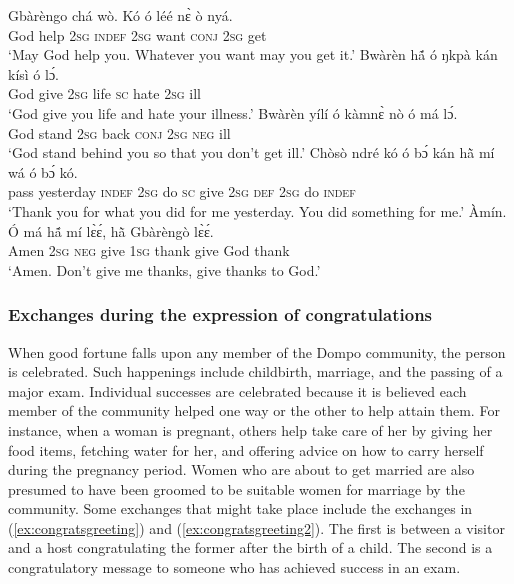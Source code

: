 \documentclass[output=paper,colorlinks,citecolor=brown]{langscibook}
\begin{document}
\ea \label{ex:gratitudegreeting}
\begin{xlist}
\ex
   \gll  Gbàrèngo 	chá	wò.	Kó	ó	léé	nɛ̀ 	ò 	nyá.\\
						God		help	\textsc{2sg}	\textsc{indef}	\textsc{2sg}	want	\textsc{conj}	\textsc{2sg}	get\\
		\glt ‘May God help you. Whatever you want may you get it.’
\ex
   \gll Bwàrèn	hã́	ó	ŋkpà	kán	kísì	ó	lɔ́.\\
    						God		give	\textsc{2sg}	life	\textsc{sc}	hate	\textsc{2sg}	ill	\\
\glt			‘God give you life and hate your illness.’
 \ex
   \gll Bwàrèn	yílí	ó	kàmnɛ̀	nò	ó	má	lɔ́.\\
   						God		stand	\textsc{2sg}	back	\textsc{conj}	\textsc{2sg}	\textsc{neg}	ill		\\
\glt			‘God stand behind you so that you don’t get ill.’
 \ex 
    \gll Chòsò	ndré		kó	ó	bɔ́	kán	hã̀	mí wá	ó	bɔ́	kó.\\
			pass	yesterday	\textsc{indef}	\textsc{2sg}	do	\textsc{sc}	give	\textsc{2sg}		\textsc{def}	\textsc{2sg}	do	\textsc{indef}		\\
	\glt	‘Thank you for what you did for me yesterday. You did something for me.’ 
  \ex
   \gll Àmín.	Ó	má	hã́	mí	lɛ̀ɛ́,	hã̀	Gbàrèngò	lɛ̀ɛ́.\\
   						Amen  \textsc{2sg}	\textsc{neg}	give	\textsc{1sg}	thank	give	God		thank		\\
\glt			‘Amen. Don’t give me thanks, give thanks to God.’
\end{xlist}
\z

\subsubsection{Exchanges during the expression of congratulations}

When good fortune falls upon any member of the Dompo community, the person is celebrated. Such happenings include childbirth, marriage, and the passing of a major exam. Individual successes are celebrated because it is believed each member of the community helped one way or the other to help attain them. For instance, when a woman is pregnant, others help take care of her by giving her food items, fetching water for her, and offering advice on how to carry herself during the pregnancy period. Women who are about to get married are also presumed to have been groomed to be suitable women for marriage by the community. Some exchanges that might take place include the exchanges in (\ref{ex:congratsgreeting}) and (\ref{ex:congratsgreeting2}). The first is between a visitor and a host congratulating the former after the birth of a child. The second is a congratulatory message to someone who has achieved success in an exam.
\end{document}
